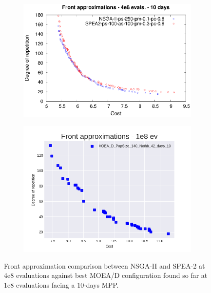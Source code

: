 \begin{figure}[H]
\begin{subfigure}{.5\textwidth}
  \centering
  \includegraphics[width=1.0\linewidth]{../references/fronts_10days.eps}
\end{subfigure}%
\begin{subfigure}{.5\textwidth}
  \centering
  \includegraphics[width=1.0\linewidth]{../experiments/plots/fronts/10_days/MOEA_D_PopSize_140_Neihb_42_days_10_10.png}
\end{subfigure}
\caption{Front approximation comparison between NSGA-II and SPEA-2 at 4e8 evaluations against best MOEA/D configuration found so far at 1e8 evaluations facing a 10-days MPP.}
\label{fig:front_comp_2}
\end{figure}


